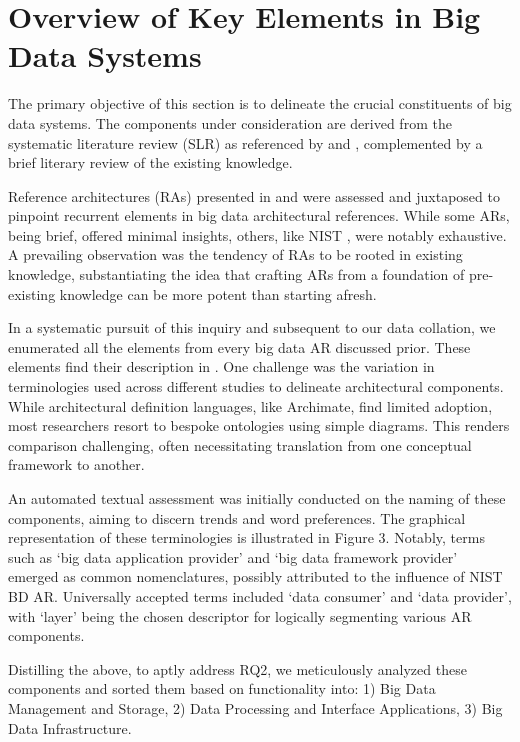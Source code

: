 \documentclass[conference]{IEEEtran}
\begin{document}
\section{Overview of Key Elements in Big Data Systems}

The primary objective of this section is to delineate the crucial constituents of big data systems. The components under consideration are derived from the systematic literature review (SLR) as referenced by \cite{b1} and \cite{b2}, complemented by a brief literary review of the existing knowledge.

Reference architectures (RAs) presented in \cite{b1} and \cite{b2} were assessed and juxtaposed to pinpoint recurrent elements in big data architectural references. While some ARs, being brief, offered minimal insights, others, like NIST \cite{b3}, were notably exhaustive. A prevailing observation was the tendency of RAs to be rooted in existing knowledge, substantiating the idea that crafting ARs from a foundation of pre-existing knowledge can be more potent than starting afresh.

In a systematic pursuit of this inquiry and subsequent to our data collation, we enumerated all the elements from every big data AR discussed prior. These elements find their description in \cite{b2}. One challenge was the variation in terminologies used across different studies to delineate architectural components. While architectural definition languages, like Archimate, find limited adoption, most researchers resort to bespoke ontologies using simple diagrams. This renders comparison challenging, often necessitating translation from one conceptual framework to another.

An automated textual assessment was initially conducted on the naming of these components, aiming to discern trends and word preferences. The graphical representation of these terminologies is illustrated in Figure 3. Notably, terms such as ‘big data application provider’ and ‘big data framework provider’ emerged as common nomenclatures, possibly attributed to the influence of NIST BD AR. Universally accepted terms included ‘data consumer’ and ‘data provider’, with ‘layer’ being the chosen descriptor for logically segmenting various AR components.

Distilling the above, to aptly address RQ2, we meticulously analyzed these components and sorted them based on functionality into: 1) Big Data Management and Storage, 2) Data Processing and Interface Applications, 3) Big Data Infrastructure.
\end{document}

